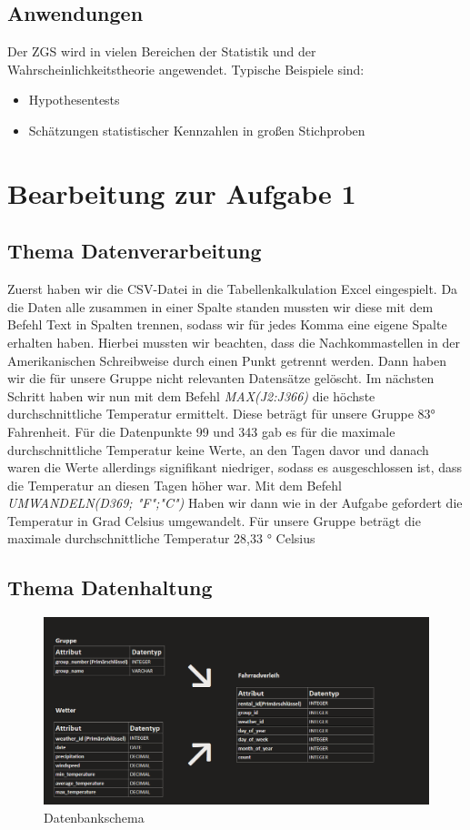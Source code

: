 \documentclass[a4paper,11pt]{article}
\begin{document}
\subsection{Anwendungen}
Der ZGS wird in vielen Bereichen der Statistik und der Wahrscheinlichkeitstheorie angewendet. Typische Beispiele sind:
\begin{itemize}
    \item Hypothesentests
    \item Sch\"atzungen statistischer Kennzahlen in großen Stichproben
\end{itemize}

\section{Bearbeitung zur Aufgabe 1}

\subsection{Thema Datenverarbeitung}
Zuerst haben wir die CSV-Datei in die Tabellenkalkulation Excel eingespielt. Da die Daten alle zusammen in einer Spalte standen mussten wir diese mit dem Befehl Text in Spalten trennen, sodass wir für jedes Komma eine eigene Spalte erhalten haben. Hierbei mussten wir beachten, dass die Nachkommastellen in der Amerikanischen Schreibweise durch einen Punkt getrennt werden. Dann haben wir die für unsere Gruppe nicht relevanten Datensätze gelöscht. Im nächsten Schritt haben wir nun mit dem Befehl \textit{MAX(J2:J366)} die höchste durchschnittliche Temperatur ermittelt. Diese beträgt für unsere Gruppe 83° Fahrenheit. Für die Datenpunkte 99 und 343 gab es für die maximale durchschnittliche Temperatur keine Werte, an den Tagen davor und danach waren die Werte allerdings signifikant niedriger, sodass es ausgeschlossen ist, dass die Temperatur an diesen Tagen höher war. Mit dem Befehl \textit{UMWANDELN(D369; "F";"C")} Haben wir dann wie in der Aufgabe gefordert die Temperatur in Grad Celsius umgewandelt. Für unsere Gruppe beträgt die maximale durchschnittliche Temperatur 28,33 ° Celsius 

\subsection{Thema Datenhaltung}
\begin{figure}[h]
\centering
\includegraphics[scale=.5]{Datenbankschema.png}
\caption{Datenbankschema}
\label{fig:meine-grafik}
\end{figure}
\end{document}
